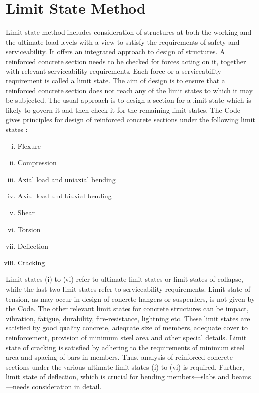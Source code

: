 \section{Limit State Method}

Limit state method includes consideration of structures at both the
working and the ultimate load levels with a view to satisfy the
requirements of safety and serviceability. It offers an integrated
approach to design of structures. A reinforced concrete section needs 
to %
be checked for forces acting on it, together with relevant serviceability
requirements. Each force or a serviceability requirement is called a 
limit state. The aim of design is to ensure that a reinforced concrete
section does not reach any of the limit states to which it may be subjected.
The usual approach is to design a section for a limit state which is
likely to govern it and then check it for the remaining limit states.
The Code gives principles for design of reinforced concrete sections
under the following limit states : 

\begin{enumerate}[(i)]
\item Flexure
\item Compression
\item Axial load and uniaxial bending
\item Axial load and biaxial bending
\item Shear
\item Torsion
\item Deflection
\item Cracking
\end{enumerate}

Limit states (i) to (vi) refer to ultimate limit states or limit states
of collapse, while the last two limit states refer to serviceability 
requirements. Limit state of tension, as may occur in design of concrete 
hangers or suspenders, is not given by the Code. The other relevant limit
states for concrete structures can be impact, vibration, fatigue,
durability, ﬁre-resistance, lightning etc. These limit states are 
satisfied by good quality concrete, adequate size of members, adequate
cover to reinforcement, provision of minimum steel area and other special
details. Limit state of cracking is satisfied by adhering to the
requirements of minimum steel area and spacing of bars in members. Thus,
analysis of reinforced concrete sections under the various ultimate limit
states (i) to (vi) is required. Further, limit state of deﬂection, which
is crucial for bending members—slabs and beams—needs consideration in 
detail.

